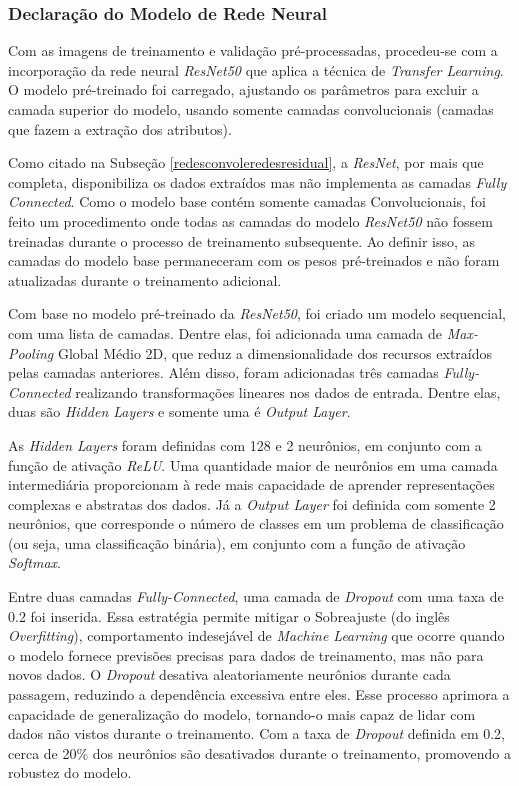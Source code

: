 
\subsubsection{\esp Declaração do Modelo de Rede Neural} \label{camadas}

Com as imagens de treinamento e validação pré-processadas, procedeu-se com a incorporação da rede neural \textit{ResNet50} que aplica a técnica de \textit{Transfer Learning}. O modelo pré-treinado foi carregado, ajustando os parâmetros para excluir a camada superior do modelo, usando somente camadas convolucionais (camadas que fazem a extração dos atributos).

Como citado na Subseção \ref{redesconvoleredesresidual}, a \textit{ResNet}, por mais que completa, disponibiliza os dados extraídos mas não implementa as camadas \textit{Fully Connected}. Como o modelo base contém somente camadas Convolucionais, foi feito um procedimento onde todas as camadas do modelo \textit{ResNet50} não fossem treinadas durante o processo de treinamento subsequente. Ao definir isso, as camadas do modelo base permaneceram com os pesos pré-treinados e não foram atualizadas durante o treinamento adicional. 

Com base no modelo pré-treinado da \textit{ResNet50}, foi criado um modelo sequencial, com uma lista de camadas. Dentre elas, foi adicionada uma camada de \textit{Max-Pooling} Global Médio 2D, que reduz a dimensionalidade dos recursos extraídos pelas camadas anteriores. Além disso, foram adicionadas três camadas \textit{Fully-Connected} realizando transformações lineares nos dados de entrada. Dentre elas, duas são \textit{Hidden Layers} e somente uma é \textit{Output Layer}.

As \textit{Hidden Layers} foram definidas com 128 e 2 neurônios, em conjunto com a função de ativação \textit{ReLU}. Uma quantidade maior de neurônios em uma camada intermediária proporcionam à rede mais capacidade de aprender representações complexas e abstratas dos dados. Já a \textit{Output Layer} foi definida com somente 2 neurônios, que corresponde o número de classes em um problema de classificação (ou seja, uma classificação binária), em conjunto com a função de ativação \textit{Softmax}.

Entre duas camadas \textit{Fully-Connected}, uma camada de \textit{Dropout} com uma taxa de 0.2 foi inserida. Essa estratégia permite mitigar o Sobreajuste (do inglês \textit{Overfitting}), comportamento indesejável de \textit{Machine Learning} que ocorre quando o modelo fornece previsões precisas para dados de treinamento, mas não para novos dados. O \textit{Dropout} desativa aleatoriamente neurônios durante cada passagem, reduzindo a dependência excessiva entre eles. Esse processo aprimora a capacidade de generalização do modelo, tornando-o mais capaz de lidar com dados não vistos durante o treinamento. Com a taxa de \textit{Dropout} definida em 0.2, cerca de 20\% dos neurônios são desativados durante o treinamento, promovendo a robustez do modelo.



